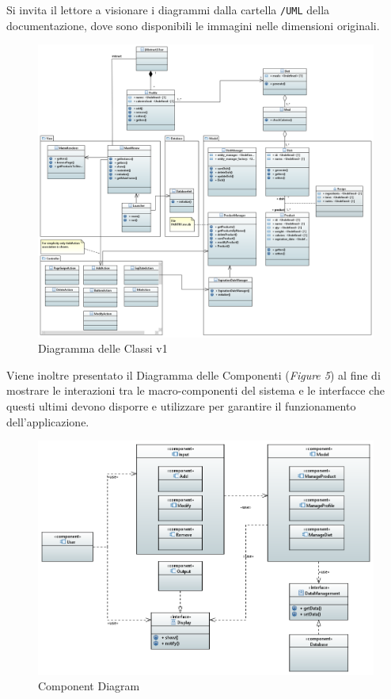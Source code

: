 \documentclass{article}
\begin{document}
Si invita il lettore a visionare i diagrammi dalla cartella \texttt{/UML} della documentazione, dove sono disponibili le immagini nelle dimensioni originali.

\begin{figure}[H]
    \centering
    \includegraphics[width=\linewidth]{imgs/ClassDiagram_0.1.0.png}
    \caption{Diagramma delle Classi v1}
    \label{fig:enter-label}
\end{figure}


Viene inoltre presentato il Diagramma delle Componenti (\textit{Figure 5}) al fine di mostrare le interazioni tra le macro-componenti del sistema e le interfacce che questi ultimi devono disporre e utilizzare per garantire il funzionamento dell'applicazione. 
\begin{figure}[H]
    \centering
    \includegraphics[width=\textwidth]{imgs/ComponentDiagram.png}
    \caption{Component Diagram}
    \label{fig:enter-label}
\end{figure}
\end{document}
